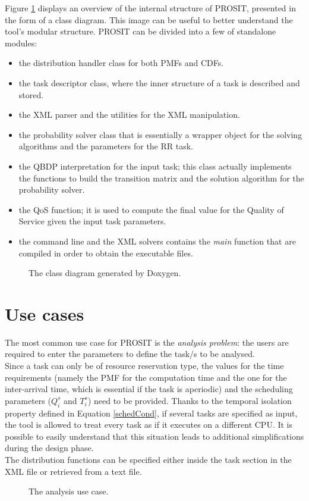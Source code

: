Figure \ref{classdiagram} displays an overview of the internal structure of PROSIT, presented in the form of a class diagram. This image can be useful to better understand the tool's modular structure. PROSIT can be divided into a few of standalone modules:
\begin{itemize}
  \item the distribution handler class for both PMFs and CDFs.
  \item the task descriptor class, where the inner structure of a task is described and stored.
  \item the XML parser and the utilities for the XML manipulation.
  \item the probability solver class that is essentially a wrapper object for the solving algorithms and the parameters for the RR task.
  \item the QBDP interpretation for the input task; this class actually implements the functions to build the transition matrix and the solution algorithm for the probability solver.
  \item the QoS function; it is used to compute the final value for the Quality of Service given the input task parameters.
  \item the command line and the XML solvers contains the \emph{main} function that are compiled in order to obtain the executable files.
\end{itemize}   

\begin{figure}[H]
  \caption{The class diagram generated by Doxygen.}
  \label{classdiagram}
\end{figure}

\section{Use cases}
The most common use case for PROSIT is the \emph{analysis problem}: the users are required to enter the parameters to define the task/s to be analysed.\\
Since a task can only be of resource reservation type, the values for the time requirements (namely the PMF for the computation time and the one for the inter-arrival time, which is essential if the task is aperiodic) and the scheduling parameters (\( Q_{i}^s \) and \( T_{i}^s \)) need to be provided. Thanks to the temporal isolation property defined in Equation \ref{schedCond}, if several tasks are specified as input, the tool is allowed to treat every task as if it executes on a different CPU. It is possible to easily understand that this situation leads to additional simplifications during the design phase.\\ 
The distribution functions can be specified either inside the task section in the XML file or retrieved from a text file.
\begin{figure}[H]
  \caption{The analysis use case.}
  \label{usecase}
\end{figure}

